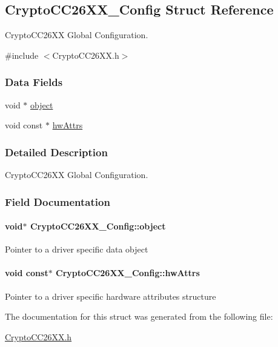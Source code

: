 \subsection{Crypto\+C\+C26\+X\+X\+\_\+\+Config Struct Reference}
\label{struct_crypto_c_c26_x_x___config}


Crypto\+C\+C26\+X\+X Global Configuration.  




{\ttfamily \#include $<$Crypto\+C\+C26\+X\+X.\+h$>$}

\subsubsection*{Data Fields}
\begin{DoxyCompactItemize}
\item 
void $\ast$ \hyperlink{struct_crypto_c_c26_x_x___config_a11efc6993566cb9306ecb09abe42db5e}{object}
\item 
void const $\ast$ \hyperlink{struct_crypto_c_c26_x_x___config_a204edbf9c5427a6c48b6dec37970c4fb}{hw\+Attrs}
\end{DoxyCompactItemize}


\subsubsection{Detailed Description}
Crypto\+C\+C26\+X\+X Global Configuration. 

\subsubsection{Field Documentation}
\paragraph[{object}]{\setlength{\rightskip}{0pt plus 5cm}void$\ast$ Crypto\+C\+C26\+X\+X\+\_\+\+Config\+::object}\label{struct_crypto_c_c26_x_x___config_a11efc6993566cb9306ecb09abe42db5e}
Pointer to a driver specific data object 
\paragraph[{hw\+Attrs}]{\setlength{\rightskip}{0pt plus 5cm}void const$\ast$ Crypto\+C\+C26\+X\+X\+\_\+\+Config\+::hw\+Attrs}\label{struct_crypto_c_c26_x_x___config_a204edbf9c5427a6c48b6dec37970c4fb}
Pointer to a driver specific hardware attributes structure 

The documentation for this struct was generated from the following file\+:\begin{DoxyCompactItemize}
\item 
\hyperlink{_crypto_c_c26_x_x_8h}{Crypto\+C\+C26\+X\+X.\+h}\end{DoxyCompactItemize}
